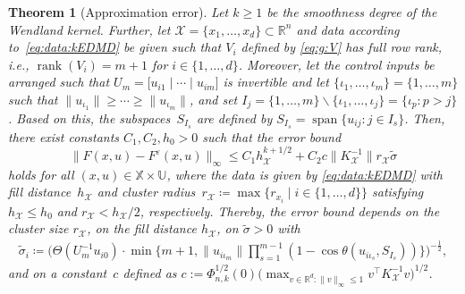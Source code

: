 \documentclass[a4paper, reqno]{amsart}
\newcommand{\R}{\ensuremath{\mathbb R}}
\newtheorem{theorem}{Theorem}[section]
\begin{document}
\begin{theorem}[Approximation error]\label{thm:control_main}
  Let $k \geq 1$ be the smoothness degree of the Wendland kernel. 
  Further, let $\mathcal{X} = \{x_1, \dots, x_d\} \subset \R^n$ and data according to~\eqref{eq:data:kEDMD} be given such that $V_i$ defined by \eqref{eq:g:V} 
    has full row rank, i.e., $\operatorname{rank}(V_i) = m + 1$ for $i \in \{1, \dots, d\}$.
    Moreover, let the control inputs be arranged such that $U_m = \big[u_{i1} \mid \cdots \mid u_{im}\big]$ is invertible and let $\{\iota_1,\ldots,\iota_m\} = \{1, \dots, m\}$ such that $\|u_{\iota_1}\|\ge\cdots\ge\|u_{\iota_m}\|$, and set $I_j = \{1, \dots, m\}\backslash\{\iota_1,\ldots,\iota_j\} = \{\iota_p : p>j\}$.       
    Based on this, the subspaces~$S_{I_s}$ are defined by $ S_{I_s}= \operatorname{span}\{u_{ij} : j\in I_s\}$.
    Then, there exist constants $C_1, C_2, h_0 > 0$ such that the error bound 
\begin{equation}\label{eq:kEDMD:error bound}
        \|F(x,u) - F^\varepsilon(x,u)\|_\infty \leq C_1 h_\mathcal{X}^{k+1/2} + C_2 c \|K_\mathcal{X}^{-1}\|r_\mathcal{X}\tilde{\sigma}
    \end{equation}
    holds for all $(x,u) \in \mathbb{X} \times \mathbb{U}$, where the data is given by \eqref{eq:data:kEDMD} with fill distance~$h_\mathcal{X}$ and cluster radius~$r_{\mathcal{X}} \coloneqq \max\{r_{x_i} \mid i \in \{1, \dots, d\}\}$ satisfying $h_\mathcal{X} \leq h_0$ and $r_{\mathcal{X}} < h_{\mathcal{X}}/2$, respectively. Thereby, the error bound depends on the cluster size $r_\mathcal{X}$, on the fill distance $h_\mathcal{X}$, on $\tilde{\sigma} > 0$ with 
    \begin{align*}
        \tilde{\sigma}_i \coloneqq \Big(\Theta(U_m^{-1}u_{i0}) \cdot \min\{m + 1, \|u_{i\iota_m}\| \prod_{s = 1}^{m - 1}(1 - \cos\theta(u_{i\iota_s}, S_{I_s}))\}\Big)^{-\frac12},
    \end{align*} 
    and on a constant~$c$ defined as $c := \Phi_{n,k}^{1/2}(0)\big( \max_{v \in \mathbb{R}^d: \| v \|_\infty \leq 1} v^\top {K}_\mathcal{X}^{-1}v \big)^{1/2}$.
\end{theorem}
\end{document}
